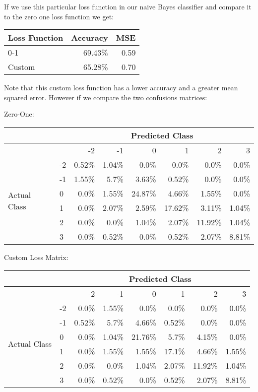 If we use this particular loss function in our naive Bayes classifier and compare it to the zero one loss function we get:
\begin{center}
	\begin{tabular}{l r r}
		\hline
		Loss Function & Accuracy & MSE  \\
		\hline
		0-1           & 69.43\%  & 0.59 \\
		Custom        & 65.28\%  & 0.70 \\
		\hline
	\end{tabular}
\end{center}

Note that this custom loss function has a lower accuracy and a greater mean squared error.
However if we compare the two confusions matrices:

Zero-One:
\begin{center}
\begin{tabular}{l l r r r r r r}
    \hline
                       &    & \multicolumn{6}{c}{Predicted Class}                   \\
    \hline
                       &    & -2      & -1    & 0       & 1       & 2       & 3     \\
    \hline
\multirow{6}{*}{Actual Class} & -2 & 0.52\% & 1.04\% & 0.0\% & 0.0\% & 0.0\% & 0.0\% \\
& -1 & 1.55\% & 5.7\% & 3.63\% & 0.52\% & 0.0\% & 0.0\% \\
& 0 & 0.0\% & 1.55\% & 24.87\% & 4.66\% & 1.55\% & 0.0\% \\
& 1 & 0.0\% & 2.07\% & 2.59\% & 17.62\% & 3.11\% & 1.04\% \\
& 2 & 0.0\% & 0.0\% & 1.04\% & 2.07\% & 11.92\% & 1.04\% \\
& 3 & 0.0\% & 0.52\% & 0.0\% & 0.52\% & 2.07\% & 8.81\% \\
\hline
\end{tabular}
\end{center}

Custom Loss Matrix:
\begin{center}
\begin{tabular}{l l r r r r r r}
    \hline
                       &    & \multicolumn{6}{c}{Predicted Class}                   \\
    \hline
                       &    & -2      & -1    & 0       & 1       & 2       & 3     \\
    \hline
\multirow{6}{*}{Actual Class} & -2 & 0.0\% & 1.55\% & 0.0\% & 0.0\% & 0.0\% & 0.0\% \\
& -1 & 0.52\% & 5.7\% & 4.66\% & 0.52\% & 0.0\% & 0.0\% \\
& 0 & 0.0\% & 1.04\% & 21.76\% & 5.7\% & 4.15\% & 0.0\% \\
& 1 & 0.0\% & 1.55\% & 1.55\% & 17.1\% & 4.66\% & 1.55\% \\
& 2 & 0.0\% & 0.0\% & 1.04\% & 2.07\% & 11.92\% & 1.04\% \\
& 3 & 0.0\% & 0.52\% & 0.0\% & 0.52\% & 2.07\% & 8.81\% \\
\hline
\end{tabular}
\end{center}

